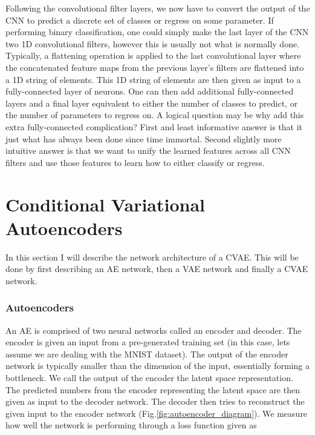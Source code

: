 Following the convolutional filter layers, we now 
have to convert the output of the CNN to predict 
a discrete set of classes or regress on some parameter. 
If performing binary classification, one could simply 
make the last layer of the \ac{CNN} two 1D convolutional 
filters, however this is usually not what is normally 
done. Typically, a flattening operation is applied 
to the last convolutional layer where the concatenated 
feature maps from the previous layer's filters 
are flattened into a 1D string of elements. This 1D 
string of elements are then given as input to 
a fully-connected layer of neurons. One can then add 
additional fully-connected layers and a final 
layer equivalent to either the number of classes to 
predict, or the number of parameters to regress on. 
A logical question may be why add this extra 
fully-connected complication? First and least 
informative answer is that it just what has 
always been done since time immortal. Second 
slightly more intuitive answer is that we want 
to unify the learned features across all 
\ac{CNN} filters and use those features to learn 
how to either classify or regress.


\section{Conditional Variational Autoencoders}

In this section I will describe the network architecture of a 
\ac{CVAE}. This will be done by first describing an \ac{AE} network, then 
a \ac{VAE} network and finally a \ac{CVAE} network.

%
%
\subsubsection{Autoencoders}

An \ac{AE} is 
comprised of two neural networks called an 
encoder and decoder. The encoder is given an input 
from a pre-generated training set (in this case, lets assume 
we are dealing with the MNIST dataset). The output of the 
encoder network is typically smaller than the dimension of 
the input, essentially forming a bottleneck. 
We call the output of the encoder the latent space representation. 
The predicted numbers from the encoder representing the latent 
space are then given as input to the decoder network. The 
decoder then tries to reconstruct the given input to the 
encoder network (Fig.\ref{fig:autoencoder_diagram}). We measure how well the network is performing 
through a loss function given as 


